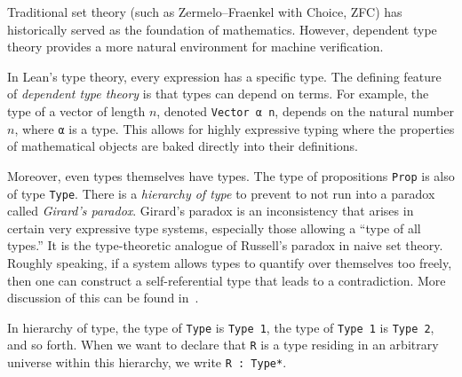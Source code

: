 Traditional set theory (such as Zermelo--Fraenkel with Choice, ZFC) has historically served
as the foundation of mathematics. However, dependent type theory provides a more natural
environment for machine verification.

In Lean's type theory, every expression has a specific type. The defining feature of
\emph{dependent type theory} is that types can depend on terms. For example,
the type of a vector of length $n$, denoted \lstinline|Vector α n|, depends on the natural
number $n$, where \lstinline|α| is a type. This allows for highly expressive typing where the properties of mathematical
objects are baked directly into their definitions.


Moreover, even types themselves have types. The type of propositions \lstinline|Prop| is also
of type \lstinline|Type|. There is a \emph{hierarchy of
type} to prevent to not run into a paradox called \emph{Girard's paradox}.
Girard's paradox is an inconsistency that arises in certain very expressive type systems,
especially those allowing a ``type of all types.'' It is the
type-theoretic analogue of Russell's paradox in naive set theory. Roughly
speaking, if a system allows types to quantify over themselves too freely,
then one can construct a self-referential type that leads to a contradiction.
More discussion of this can be found in~\cite{coquand1986analysis}.

In hierarchy of type, the type of \lstinline|Type| is \lstinline|Type 1|, the
type of \lstinline|Type 1| is \lstinline|Type 2|, and so forth. When we
want to declare that \lstinline|R| is a type residing in an arbitrary
universe within this hierarchy, we write \lstinline|R : Type*|.






